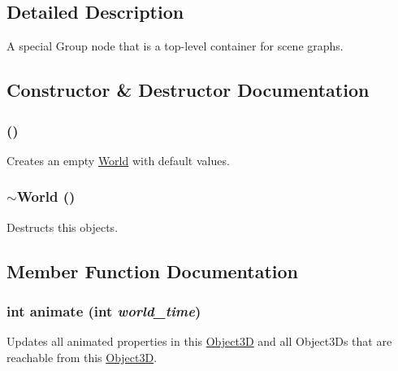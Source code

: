 \subsection{Detailed Description}
A special Group node that is a top-level container for scene graphs. 

\subsection{Constructor \& Destructor Documentation}
\hypertarget{classm3g_1_1World_75e827b8787e735882f60c266d58e02e}{
\subsubsection[{World}]{ ()}}
\label{classm3g_1_1World_75e827b8787e735882f60c266d58e02e}


Creates an empty \hyperlink{classm3g_1_1World}{World} with default values. \hypertarget{classm3g_1_1World_bd170ded455f0b2273c1fe06da6ea0cb}{
\subsubsection[{$\sim$World}]{\setlength{\rightskip}{0pt plus 5cm}$\sim${\bf World} ()}}
\label{classm3g_1_1World_bd170ded455f0b2273c1fe06da6ea0cb}


Destructs this objects. 

\subsection{Member Function Documentation}
\hypertarget{classm3g_1_1World_8aad1ceab4c2a03609c8a42324ce484d}{
\subsubsection[{animate}]{\setlength{\rightskip}{0pt plus 5cm}int animate (int {\em world\_\-time})}}
\label{classm3g_1_1World_8aad1ceab4c2a03609c8a42324ce484d}


Updates all animated properties in this \hyperlink{classm3g_1_1Object3D}{Object3D} and all Object3Ds that are reachable from this \hyperlink{classm3g_1_1Object3D}{Object3D}. 

